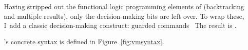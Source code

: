 \documentclass[manuscript,screen,review, 12pt, nonacm]{acmart}
\begin{document}
        Having stripped out the functional logic programming elements of \VC
        (backtracking and multiple results), only the decision-making bits are
        left over. To wrap these, I~add a classic decision-making construct:
        guarded commands~\citep{dijkstra} The result is \VMinus. 

        \VMinus's concrete syntax is defined in Figure~\ref{fig:vmsyntax}.





\end{document}
